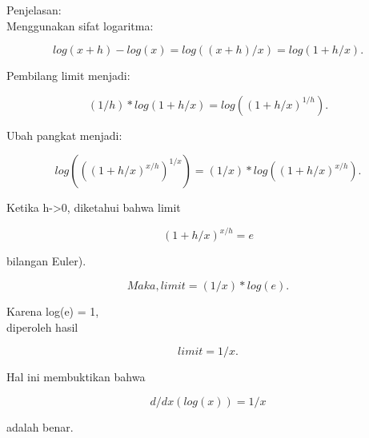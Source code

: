 \documentclass[a4paper,10pt]{article}
\begin{document}
\begin{eulernotebook}
\begin{eulercomment}
\begin{eulercomment}
\begin{eulercomment}
\begin{eulercomment}
\begin{eulercomment}
Penjelasan:\\
Menggunakan sifat logaritma:\\
\end{eulercomment}
\begin{eulerformula}
\[
log(x+h) - log(x) = log((x+h)/x) = log(1 + h/x).
\]
\end{eulerformula}
\begin{eulercomment}
Pembilang limit menjadi:\\
\end{eulercomment}
\begin{eulerformula}
\[
(1/h) * log(1 + h/x) = log((1 + h/x)^{1/h}).
\]
\end{eulerformula}
\begin{eulercomment}
Ubah pangkat menjadi:\\
\end{eulercomment}
\begin{eulerformula}
\[
log(((1 + h/x)^{x/h})^{1/x}) = (1/x) * log((1 + h/x)^{x/h}).
\]
\end{eulerformula}
\begin{eulercomment}
Ketika h-\textgreater{}0, diketahui bahwa limit\\
\end{eulercomment}
\begin{eulerformula}
\[
(1 + h/x)^{x/h} = e
\]
\end{eulerformula}
\begin{eulercomment}
bilangan Euler).\\
\end{eulercomment}
\begin{eulerformula}
\[
Maka, limit = (1/x) * log(e).
\]
\end{eulerformula}
\begin{eulercomment}
Karena log(e) = 1,\\
diperoleh hasil\\
\end{eulercomment}
\begin{eulerformula}
\[
limit = 1/x.
\]
\end{eulerformula}
\begin{eulercomment}
Hal ini membuktikan bahwa\\
\end{eulercomment}
\begin{eulerformula}
\[
d/dx (log(x)) = 1/x
\]
\end{eulerformula}
\begin{eulercomment}
adalah benar.



\end{eulercomment}
\end{eulercomment}
\end{eulercomment}
\end{eulercomment}
\end{eulercomment}
\end{eulernotebook}
\end{document}
